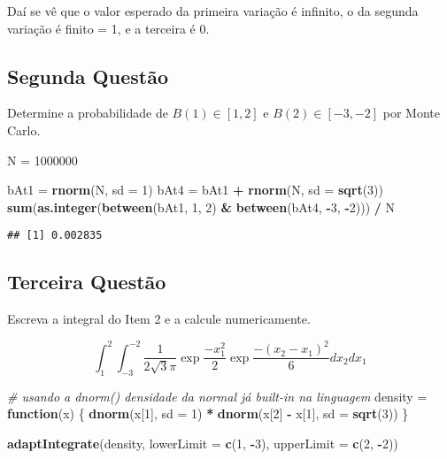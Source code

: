 \documentclass[]{article}
\newenvironment{Shaded}{\begin{snugshade}}{\end{snugshade}}
\newcommand{\KeywordTok}[1]{\textcolor[rgb]{0.13,0.29,0.53}{\textbf{#1}}}
\newcommand{\DataTypeTok}[1]{\textcolor[rgb]{0.13,0.29,0.53}{#1}}
\newcommand{\DecValTok}[1]{\textcolor[rgb]{0.00,0.00,0.81}{#1}}
\newcommand{\StringTok}[1]{\textcolor[rgb]{0.31,0.60,0.02}{#1}}
\newcommand{\CommentTok}[1]{\textcolor[rgb]{0.56,0.35,0.01}{\textit{#1}}}
\newcommand{\ControlFlowTok}[1]{\textcolor[rgb]{0.13,0.29,0.53}{\textbf{#1}}}
\newcommand{\OperatorTok}[1]{\textcolor[rgb]{0.81,0.36,0.00}{\textbf{#1}}}
\newcommand{\NormalTok}[1]{#1}
\begin{document}
Daí se vê que o valor esperado da primeira variação é infinito, o da
segunda variação é finito = 1, e a terceira é 0.

\subsection{Segunda Questão}\label{segunda-questao}

Determine a probabilidade de \(B(1) \in [1, 2]\) e \(B(2) \in [-3, -2]\)
por Monte Carlo.

\begin{Shaded}
\begin{Highlighting}[]
\NormalTok{N =}\StringTok{ }\DecValTok{1000000}

\NormalTok{bAt1 =}\StringTok{ }\KeywordTok{rnorm}\NormalTok{(N, }\DataTypeTok{sd =} \DecValTok{1}\NormalTok{)}
\NormalTok{bAt4 =}\StringTok{ }\NormalTok{bAt1 }\OperatorTok{+}\StringTok{ }\KeywordTok{rnorm}\NormalTok{(N, }\DataTypeTok{sd =} \KeywordTok{sqrt}\NormalTok{(}\DecValTok{3}\NormalTok{))}
\KeywordTok{sum}\NormalTok{(}\KeywordTok{as.integer}\NormalTok{(}\KeywordTok{between}\NormalTok{(bAt1, }\DecValTok{1}\NormalTok{, }\DecValTok{2}\NormalTok{) }\OperatorTok{&}\StringTok{ }\KeywordTok{between}\NormalTok{(bAt4, }\OperatorTok{-}\DecValTok{3}\NormalTok{, }\OperatorTok{-}\DecValTok{2}\NormalTok{))) }\OperatorTok{/}\StringTok{ }\NormalTok{N}
\end{Highlighting}
\end{Shaded}

\begin{verbatim}
## [1] 0.002835
\end{verbatim}

\subsection{Terceira Questão}\label{terceira-questao}

Escreva a integral do Item 2 e a calcule numericamente.

\[\int_1^2 \int_{-3}^{-2} \frac{1}{2\sqrt 3\pi}\exp{\frac{-x_1^2}{2}} \exp{\frac{-(x_2-x_1)^2}{6}}dx_2dx_1\]

\begin{Shaded}
\begin{Highlighting}[]
\CommentTok{# usando a dnorm() densidade da normal já built-in na linguagem}
\NormalTok{density =}\StringTok{ }\ControlFlowTok{function}\NormalTok{(x) \{}
  \KeywordTok{dnorm}\NormalTok{(x[}\DecValTok{1}\NormalTok{], }\DataTypeTok{sd =} \DecValTok{1}\NormalTok{) }\OperatorTok{*}\StringTok{ }\KeywordTok{dnorm}\NormalTok{(x[}\DecValTok{2}\NormalTok{] }\OperatorTok{-}\StringTok{ }\NormalTok{x[}\DecValTok{1}\NormalTok{], }\DataTypeTok{sd =} \KeywordTok{sqrt}\NormalTok{(}\DecValTok{3}\NormalTok{))}
\NormalTok{\}}

\KeywordTok{adaptIntegrate}\NormalTok{(density, }\DataTypeTok{lowerLimit =} \KeywordTok{c}\NormalTok{(}\DecValTok{1}\NormalTok{, }\OperatorTok{-}\DecValTok{3}\NormalTok{), }\DataTypeTok{upperLimit =} \KeywordTok{c}\NormalTok{(}\DecValTok{2}\NormalTok{, }\OperatorTok{-}\DecValTok{2}\NormalTok{))}
\end{Highlighting}
\end{Shaded}
\end{document}
